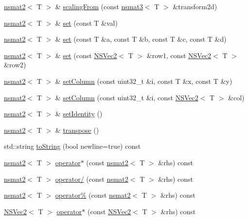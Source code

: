 \begin{DoxyCompactItemize}
\item 
\hyperlink{structnsmat2}{nsmat2}$<$ T $>$ \& \hyperlink{structnsmat2_a9ae5952c5907940fbdd63403dcf358c5}{scaling\-From} (const \hyperlink{structnsmat3}{nsmat3}$<$ T $>$ \&transform2d)
\item 
\hyperlink{structnsmat2}{nsmat2}$<$ T $>$ \& \hyperlink{structnsmat2_aa86bb6cd0b53b6dc46b40ca5d215eb79}{set} (const T \&val)
\item 
\hyperlink{structnsmat2}{nsmat2}$<$ T $>$ \& \hyperlink{structnsmat2_aee14e7cd7ced35e54b10a95284dbd9cb}{set} (const T \&a, const T \&b, const T \&c, const T \&d)
\item 
\hyperlink{structnsmat2}{nsmat2}$<$ T $>$ \& \hyperlink{structnsmat2_af3e4186bac54ad97bc2c8a05759eaa66}{set} (const \hyperlink{structNSVec2}{N\-S\-Vec2}$<$ T $>$ \&row1, const \hyperlink{structNSVec2}{N\-S\-Vec2}$<$ T $>$ \&row2)
\item 
\hyperlink{structnsmat2}{nsmat2}$<$ T $>$ \& \hyperlink{structnsmat2_ab6ffe87963350f984a5584df85e0d263}{set\-Column} (const uint32\-\_\-t \&i, const T \&x, const T \&y)
\item 
\hyperlink{structnsmat2}{nsmat2}$<$ T $>$ \& \hyperlink{structnsmat2_a05167982706fec64097cfbf707459c01}{set\-Column} (const uint32\-\_\-t \&i, const \hyperlink{structNSVec2}{N\-S\-Vec2}$<$ T $>$ \&col)
\item 
\hyperlink{structnsmat2}{nsmat2}$<$ T $>$ \& \hyperlink{structnsmat2_a87438a3320ff865b4faf068716ad386f}{set\-Identity} ()
\item 
\hyperlink{structnsmat2}{nsmat2}$<$ T $>$ \& \hyperlink{structnsmat2_a2b19dca33fda0b2169340bac241728d0}{transpose} ()
\item 
std\-::string \hyperlink{structnsmat2_a81b23631f6035cf4518d86e5325be761}{to\-String} (bool newline=true) const 
\item 
\hyperlink{structnsmat2}{nsmat2}$<$ T $>$ \hyperlink{structnsmat2_a02ee2a07ff8683cf4c98608bbcddfa9b}{operator$\ast$} (const \hyperlink{structnsmat2}{nsmat2}$<$ T $>$ \&rhs) const 
\item 
\hyperlink{structnsmat2}{nsmat2}$<$ T $>$ \hyperlink{structnsmat2_aa225314cae5641252510c0e7e19ce924}{operator/} (const \hyperlink{structnsmat2}{nsmat2}$<$ T $>$ \&rhs) const 
\item 
\hyperlink{structnsmat2}{nsmat2}$<$ T $>$ \hyperlink{structnsmat2_a7eda4e70be667cdb5c30c2105609406c}{operator\%} (const \hyperlink{structnsmat2}{nsmat2}$<$ T $>$ \&rhs) const 
\item 
\hyperlink{structNSVec2}{N\-S\-Vec2}$<$ T $>$ \hyperlink{structnsmat2_a1e56e3c1c402abca39a1e3411408899d}{operator$\ast$} (const \hyperlink{structNSVec2}{N\-S\-Vec2}$<$ T $>$ \&rhs) const 

\end{DoxyCompactItemize}
